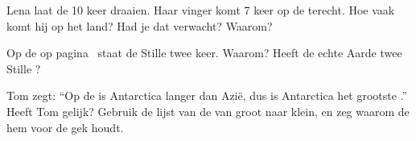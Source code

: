 \begin{exercise}[$\star\star$]\label{exo:g3:continents-and-oceans:8}
Lena laat de  10 keer draaien. Haar vinger komt 7 keer op de 
terecht. Hoe vaak komt hij op het land? Had je dat verwacht? Waarom?
\end{exercise}

\begin{exercise}[$\star\star$]\label{exo:g3:continents-and-oceans:9}
Op de  op pagina~\pageref{fig:g3:continents-and-oceans:world-map}
staat de Stille  twee keer. Waarom? Heeft de echte Aarde twee Stille
?
\end{exercise}

\begin{exercise}[$\star\star\star$]\label{exo:g3:continents-and-oceans:10}
Tom zegt: ``Op de  is Antarctica langer dan Azië, dus is
Antarctica het grootste .'' Heeft Tom gelijk? Gebruik de lijst
van de  van groot naar klein, en zeg waarom de  hem
voor de gek houdt.
\end{exercise}
